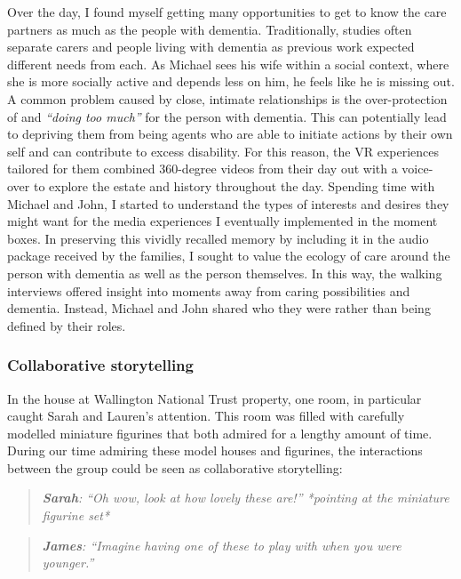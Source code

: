 Over the day, I found myself getting many opportunities to get to know the care partners as much as the people with dementia. Traditionally, studies often separate carers and people living with dementia as previous work expected different needs from each. As Michael sees his wife within a social context, where she is more socially active and depends less on him, he feels like he is missing out. A common problem caused by close, intimate relationships is the over-protection of and \textit{``doing too much''} for the person with dementia. This can potentially lead to depriving them from being agents who are able to initiate actions by their own self and can contribute to excess disability. For this reason, the VR experiences tailored for them combined 360-degree videos from their day out with a voice-over to explore the estate and history throughout the day. Spending time with Michael and John, I started to understand the types of interests and desires they might want for the media experiences I eventually implemented in the moment boxes. In preserving this vividly recalled memory by including it in the audio package received by the families, I sought to value the ecology of care around the person with dementia as well as the person themselves. In this way, the walking interviews offered insight into moments away from caring possibilities and dementia. Instead, Michael and John shared who they were rather than being defined by their roles. 

\subsubsection{Collaborative storytelling}
\label{CollabStorytelling}
In the house at Wallington National Trust property, one room,
in particular caught Sarah and Lauren's attention. This room was filled with carefully modelled miniature figurines that both admired for a lengthy amount of time. During our time admiring these model houses and figurines, the interactions between the group could be seen as collaborative storytelling:
\begin{quote}
   \textit{\textbf{ Sarah}: ``Oh wow, look at how lovely these are!''
   *pointing at the miniature figurine set*}
\end{quote}

\begin{quote}
    \textit{\textbf{James}:  ``Imagine having one of these to play with when you were younger.''}
\end{quote}

